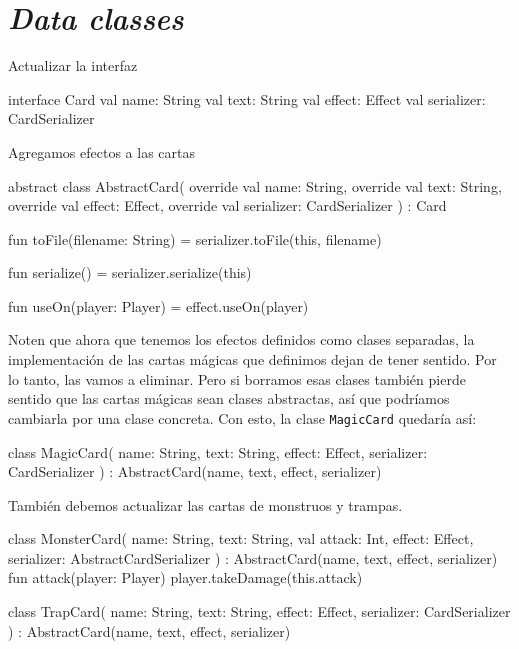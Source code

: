 \section{\textit{Data classes}}
  \label{sec:oop:strategy:data_classes}
  
  Actualizar la interfaz
  \begin{kotlin}
    interface Card {
      val name: String
      val text: String
      val effect: Effect
      val serializer: CardSerializer
    }
  \end{kotlin}

  Agregamos efectos a las cartas
  \begin{kotlin}
    abstract class AbstractCard(
      override val name: String,
      override val text: String,
      override val effect: Effect,
      override val serializer: CardSerializer
    ) : Card {

      fun toFile(filename: String) = serializer.toFile(this, filename)

      fun serialize() = serializer.serialize(this)

      fun useOn(player: Player) = effect.useOn(player)
    }
  \end{kotlin}

  Noten que ahora que tenemos los efectos definidos como clases separadas, la implementación de las
  cartas mágicas que definimos dejan de tener sentido.
  Por lo tanto, las vamos a eliminar.
  Pero si borramos esas clases también pierde sentido que las cartas mágicas sean clases abstractas,
  así que podríamos cambiarla por una clase concreta.
  Con esto, la clase \texttt{MagicCard} quedaría así:

  \begin{kotlin}
    class MagicCard(
      name: String,
      text: String,
      effect: Effect,
      serializer: CardSerializer
    ) : AbstractCard(name, text, effect, serializer)
  \end{kotlin}

  También debemos actualizar las cartas de monstruos y trampas.

  \begin{kotlin}
    class MonsterCard(
      name: String,
      text: String,
      val attack: Int,
      effect: Effect,
      serializer: AbstractCardSerializer
    ) : AbstractCard(name, text, effect, serializer) {
      fun attack(player: Player) {
        player.takeDamage(this.attack)
      }
    }
  \end{kotlin}

  \begin{kotlin}
    class TrapCard(
      name: String,
      text: String,
      effect: Effect,
      serializer: CardSerializer
    ) : AbstractCard(name, text, effect, serializer)
  \end{kotlin}

